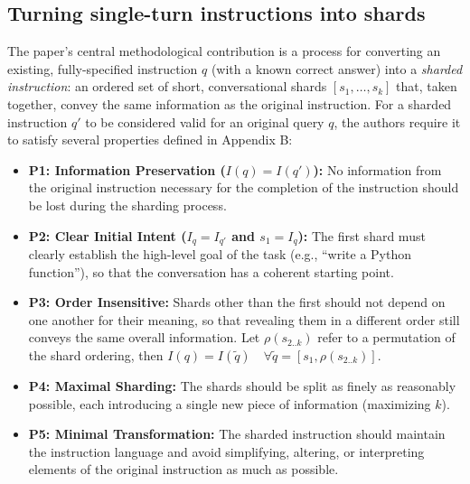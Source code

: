 \documentclass[manuscript,review]{acmart}
\begin{document}
\subsection{Turning single-turn instructions into shards}
The paper's central methodological contribution is a process for converting an existing, fully-specified instruction $q$ (with a known correct answer) into a \emph{sharded instruction}: an ordered set of short, conversational shards $[s_1, \ldots, s_k]$ that, taken together, convey the same information as the original instruction. For a sharded instruction $q'$ to be considered valid for an original query $q$, the authors require it to satisfy several properties defined in Appendix B:
\begin{itemize}
    \item \textbf{P1: Information Preservation ($I(q) = I(q')$):} No information from the original instruction necessary for the completion of the instruction should be lost during the sharding process.
    \item \textbf{P2: Clear Initial Intent ($I_q = I_{q'}$ and $s_1 = I_q$):} The first shard must clearly establish the high-level goal of the task (e.g., ``write a Python function''), so that the conversation has a coherent starting point.
    \item \textbf{P3: Order Insensitive:} Shards other than the first should not depend on one another for their meaning, so that revealing them in a different order still conveys the same overall information. Let $\rho(s_{2..k})$ refer to a permutation of the shard ordering, then $I(q) = I(\tilde{q}) \quad \forall \tilde{q} = [s_1, \rho(s_{2..k})]$.
    \item \textbf{P4: Maximal Sharding:} The shards should be split as finely as reasonably possible, each introducing a single new piece of information (maximizing $k$).
    \item \textbf{P5: Minimal Transformation:} The sharded instruction should maintain the instruction language and avoid simplifying, altering, or interpreting elements of the original instruction as much as possible.
\end{itemize}
 
\end{document}
